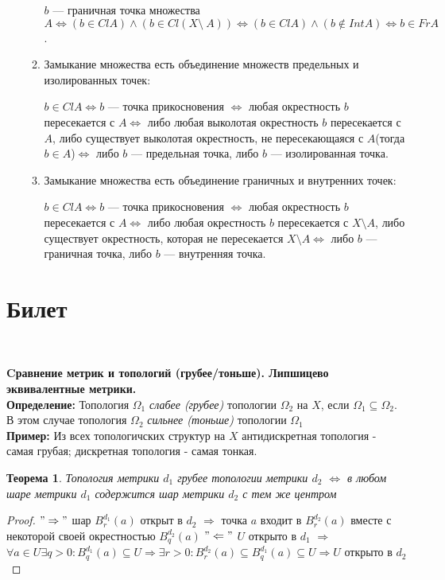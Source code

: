 \documentclass[a4paper,100pt]{article}
\theoremstyle{indented}
\newtheorem{theorem}{Теорема}
\begin{document}
\begin{itemize}
\begin{enumerate}
            $b$ --- граничная точка множества $A \iff (b \in ClA) \wedge (b \in Cl(X \setminus~ A)) \iff (b\in ClA) \wedge (b \notin IntA) \iff b \in FrA$.
        \item Замыкание множества есть объединение множеств предельных и изолированных точек:
        
        $b \in ClA \iff b$ --- точка прикосновения $\iff$ любая окрестность $b$ пересекается с $A \iff$ либо любая выколотая окрестность $b$ пересекается с $A$, либо существует выколотая окрестность, не пересекающаяся с $A$(тогда $b \in A$)$\iff$ либо $b$ --- предельная точка, либо $b$ --- изолированная точка.     
        \item Замыкание множества есть объединение граничных и внутренних точек:
        
        $b \in ClA \iff b$ --- точка прикосновения $\iff$ любая окрестность $b$ пересекается с $A \iff$ либо любая окрестность $b$ пересекается с $X \setminus A$, либо существует окрестность, которая не пересекается $X \setminus A \iff$ либо $b$ --- граничная точка, либо $b$ --- внутренняя точка.
    \end{enumerate}
\end{itemize}


\section{Билет} \

\medskip 

\textbf{Cравнение метрик и топологий (грубее/тоньше). Липшицево эквивалентные метрики.}\\

\textbf{Определение: } Топология $\Omega_1$ \textit{слабее (грубее)} \hypertarget{n12}{топологии} $\Omega_2$ на $X$, если $\Omega_1 \subseteq \Omega_2$. В этом случае топология $\Omega_2$ \textit{сильнее (тоньше)} топологии $\Omega_1$
\\

\textbf{Пример: } Из всех топологичских структур на $X$ антидискретная топология - самая грубая; дискретная топология - самая тонкая.
\\
\begin{theorem}
 Топология метрики $d_1$ грубее топологии метрики $d_2$ $\Longleftrightarrow$ в любом шаре метрики $d_1$ содержится шар метрики $d_2$ с тем же центром
\end{theorem}

\begin{proof} 
    $"\Rightarrow"$ шар $B_r^{d_1}(a)$ открыт в $d_2$ $\Rightarrow$ точка $a$ входит в $B_r^{d_2}(a)$ вместе с некоторой своей окрестностью $B_q^{d_2}(a)$ 
$"\Leftarrow"$ $U$ открыто в $d_1$ $\Rightarrow$ $\forall a \in U \exists q>0 : B_q^{d_1}(a) \subseteq U \Rightarrow \exists r > 0 : B_r^{d_2}(a) \subseteq B_q^{d_1}(a) \subseteq U \Rightarrow U$ открыто в $d_2$ 
\end{proof}
\end{document}
